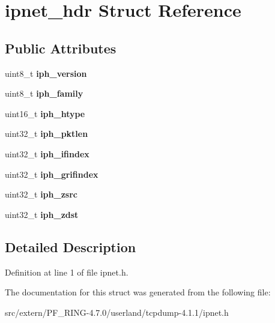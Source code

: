 \hypertarget{structipnet__hdr}{
\section{ipnet\_\-hdr Struct Reference}
\label{structipnet__hdr}
}
\subsection*{Public Attributes}
\begin{DoxyCompactItemize}
\item 
\hypertarget{structipnet__hdr_a7964788f27aabc12746d956bc977d454}{
uint8\_\-t {\bfseries iph\_\-version}}
\label{structipnet__hdr_a7964788f27aabc12746d956bc977d454}

\item 
\hypertarget{structipnet__hdr_af46608b4d48b47436566f001e0f02a2d}{
uint8\_\-t {\bfseries iph\_\-family}}
\label{structipnet__hdr_af46608b4d48b47436566f001e0f02a2d}

\item 
\hypertarget{structipnet__hdr_a2021099c1e270598cf501c4d5a6058ff}{
uint16\_\-t {\bfseries iph\_\-htype}}
\label{structipnet__hdr_a2021099c1e270598cf501c4d5a6058ff}

\item 
\hypertarget{structipnet__hdr_ae402912b1eaf48f948688cd9af080b1d}{
uint32\_\-t {\bfseries iph\_\-pktlen}}
\label{structipnet__hdr_ae402912b1eaf48f948688cd9af080b1d}

\item 
\hypertarget{structipnet__hdr_aaf8624efae51a0bba658d3df055c4165}{
uint32\_\-t {\bfseries iph\_\-ifindex}}
\label{structipnet__hdr_aaf8624efae51a0bba658d3df055c4165}

\item 
\hypertarget{structipnet__hdr_a69e24b83a1dbaae0cd9991a95af0100b}{
uint32\_\-t {\bfseries iph\_\-grifindex}}
\label{structipnet__hdr_a69e24b83a1dbaae0cd9991a95af0100b}

\item 
\hypertarget{structipnet__hdr_adf50dea137aa61f4a2bfa64423d937d8}{
uint32\_\-t {\bfseries iph\_\-zsrc}}
\label{structipnet__hdr_adf50dea137aa61f4a2bfa64423d937d8}

\item 
\hypertarget{structipnet__hdr_a9492222a89f7d4d3c55653976e4eb84b}{
uint32\_\-t {\bfseries iph\_\-zdst}}
\label{structipnet__hdr_a9492222a89f7d4d3c55653976e4eb84b}

\end{DoxyCompactItemize}


\subsection{Detailed Description}


Definition at line 1 of file ipnet.h.



The documentation for this struct was generated from the following file:\begin{DoxyCompactItemize}
\item 
src/extern/PF\_\-RING-\/4.7.0/userland/tcpdump-\/4.1.1/ipnet.h\end{DoxyCompactItemize}
